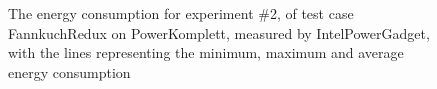 \begin{figure}
                    \caption{The energy consumption for experiment \#2, of test case FannkuchRedux on PowerKomplett, measured by IntelPowerGadget, with the lines representing the minimum, maximum and average energy consumption} \label{fig:time_series_FannkuchRedux_PowerKomplett_IntelPowerGadget_exp2}
                    \end{figure}
                    